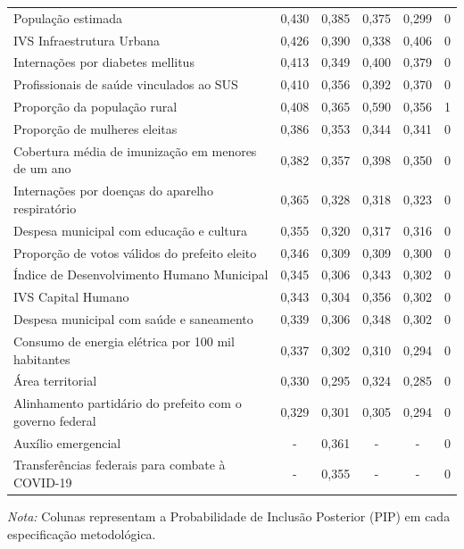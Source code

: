 \begin{table}[htbp]
\begin{tabular}{lccccr}
População estimada & 0,430 & 0,385 & 0,375 & 0,299 & 0 \\
IVS Infraestrutura Urbana & 0,426 & 0,390 & 0,338 & 0,406 & 0 \\
Internações por diabetes mellitus & 0,413 & 0,349 & 0,400 & 0,379 & 0 \\
Profissionais de saúde vinculados ao SUS & 0,410 & 0,356 & 0,392 & 0,370 & 0 \\
Proporção da população rural & 0,408 & 0,365 & 0,590 & 0,356 & 1 \\
Proporção de mulheres eleitas & 0,386 & 0,353 & 0,344 & 0,341 & 0 \\
Cobertura média de imunização em menores de um ano & 0,382 & 0,357 & 0,398 & 0,350 & 0 \\
Internações por doenças do aparelho respiratório & 0,365 & 0,328 & 0,318 & 0,323 & 0 \\
Despesa municipal com educação e cultura & 0,355 & 0,320 & 0,317 & 0,316 & 0 \\
Proporção de votos válidos do prefeito eleito & 0,346 & 0,309 & 0,309 & 0,300 & 0 \\
Índice de Desenvolvimento Humano Municipal & 0,345 & 0,306 & 0,343 & 0,302 & 0 \\
IVS Capital Humano & 0,343 & 0,304 & 0,356 & 0,302 & 0 \\
Despesa municipal com saúde e saneamento & 0,339 & 0,306 & 0,348 & 0,302 & 0 \\
Consumo de energia elétrica por 100 mil habitantes & 0,337 & 0,302 & 0,310 & 0,294 & 0 \\
Área territorial & 0,330 & 0,295 & 0,324 & 0,285 & 0 \\
Alinhamento partidário do prefeito com o governo federal & 0,329 & 0,301 & 0,305 & 0,294 & 0 \\
Auxílio emergencial & - & 0,361 & - & - & 0 \\
Transferências federais para combate à COVID-19 & - & 0,355 & - & - & 0 \\
\bottomrule
\end{tabular}
\begin{tablenotes}\footnotesize
\item \textit{Nota:} Colunas representam a Probabilidade de Inclusão Posterior (PIP) em cada especificação metodológica.
\end{tablenotes}
\end{table}